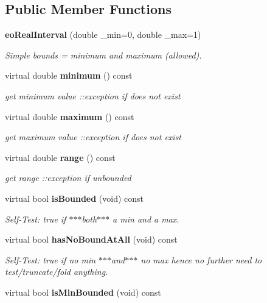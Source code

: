 \subsection*{Public Member Functions}
\begin{CompactItemize}
\item 
{\bf eo\-Real\-Interval} (double \_\-min=0, double \_\-max=1)\label{classeo_real_interval_a1}

\begin{CompactList}\small\item\em Simple bounds = minimum and maximum (allowed). \item\end{CompactList}\item 
virtual double {\bf minimum} () const \label{classeo_real_interval_a2}

\begin{CompactList}\small\item\em get minimum value ::exception if does not exist \item\end{CompactList}\item 
virtual double {\bf maximum} () const \label{classeo_real_interval_a3}

\begin{CompactList}\small\item\em get maximum value ::exception if does not exist \item\end{CompactList}\item 
virtual double {\bf range} () const \label{classeo_real_interval_a4}

\begin{CompactList}\small\item\em get range ::exception if unbounded \item\end{CompactList}\item 
virtual bool {\bf is\-Bounded} (void) const \label{classeo_real_interval_a5}

\begin{CompactList}\small\item\em Self-Test: true if $\ast$$\ast$$\ast$both$\ast$$\ast$$\ast$ a min and a max. \item\end{CompactList}\item 
virtual bool {\bf has\-No\-Bound\-At\-All} (void) const \label{classeo_real_interval_a6}

\begin{CompactList}\small\item\em Self-Test: true if no min $\ast$$\ast$$\ast$and$\ast$$\ast$$\ast$ no max hence no further need to test/truncate/fold anything. \item\end{CompactList}\item 
virtual bool {\bf is\-Min\-Bounded} (void) const \label{classeo_real_interval_a7}


\end{CompactItemize}
